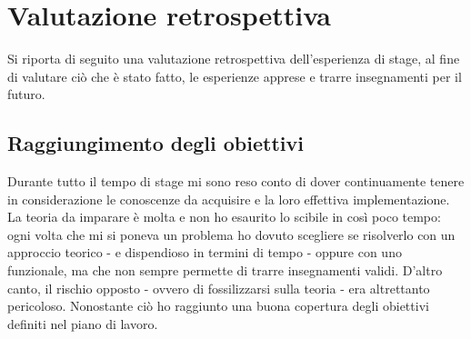 
\chapter{Valutazione retrospettiva}
Si riporta di seguito una valutazione retrospettiva dell'esperienza di stage, al fine di valutare ciò che è stato fatto, le esperienze apprese e trarre insegnamenti per il futuro.

\section{Raggiungimento degli obiettivi}
Durante tutto il tempo di stage mi sono reso conto di dover continuamente tenere in considerazione le conoscenze da acquisire e la loro effettiva implementazione. La teoria da imparare è molta e non ho esaurito lo scibile in così poco tempo: ogni volta che mi si poneva un problema ho dovuto scegliere se risolverlo con un approccio teorico - e dispendioso in termini di tempo - oppure con uno funzionale, ma che non sempre permette di trarre insegnamenti validi. D'altro canto, il rischio opposto - ovvero di fossilizzarsi sulla teoria - era altrettanto pericoloso. Nonostante ciò ho raggiunto una buona copertura degli obiettivi definiti nel piano di lavoro.
\newpage
